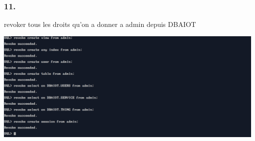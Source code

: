 \subsubsection*{11.}

revoker tous les droits qu'on a donner a admin depuis DBAIOT



\begin{center}
    \includegraphics[width=\textwidth]{ScreenShot/Partie4/revoke.png}
\end{center}

